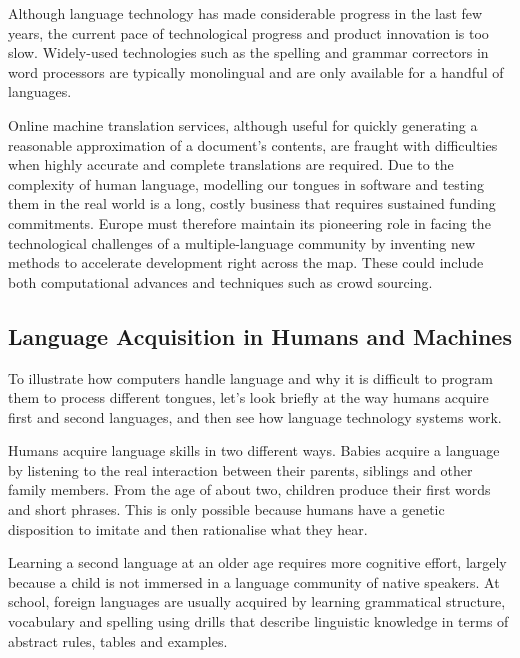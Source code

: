 \begin{multicols}{2}
Although language technology has made considerable progress in the last few years, the current pace of technological progress and product innovation is too slow. Widely-used technologies such as the spelling and grammar correctors in word processors are typically monolingual and are only available for a handful of languages.


Online machine translation services, although useful for quickly generating a reasonable approximation of a document’s contents, are fraught with difficulties when highly accurate and complete translations are required. Due to the complexity of human language, modelling our tongues in software and testing them in the real world is a long, costly business that requires sustained funding commitments. Europe must therefore maintain its pioneering role in facing the technological challenges of a multiple-language community by inventing new methods to accelerate development right across the map. These could include both computational advances and techniques such as crowd sourcing.
\vfill

\subsection{Language Acquisition in Humans and Machines}

To illustrate how computers handle language and why it is difficult to program them to process different tongues, let’s look briefly at the way humans acquire first and second languages, and then see how language technology systems work.

Humans acquire language skills in two different ways. Babies acquire a language by listening to the real interaction between their parents, siblings and other family members. From the age of about two, children produce their first words and short phrases. This is only possible because humans have a genetic disposition to imitate and then rationalise what they hear.

Learning a second language at an older age requires more cognitive effort,  largely because a child is not immersed in a language community of native speakers. At school, foreign languages are usually acquired by learning grammatical structure, vocabulary and spelling using drills that describe linguistic knowledge in terms of abstract rules, tables and examples.



\end{multicols}
